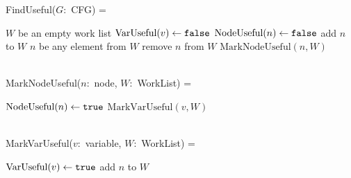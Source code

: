 
FindUseful($G$:~CFG) =
\begin{myalgorithmic}
\LET $W$ be an empty work list
 \STATE $\text{VarUseful}(v) \gets \texttt{false}$
\ENDFOR
{}
 \STATE $\text{NodeUseful}(n) \gets \texttt{false}$
  \STATE add $n$ to $W$
 \ENDIF
\ENDFOR
      \EMPTYLINE
{}
 \LET $n$ be any element from $W$
 \STATE remove $n$ from $W$
 \STATE $\text{MarkNodeUseful}(n, W)$
\ENDWHILE
\end{myalgorithmic}
~\\
MarkNodeUseful($n$:~node, $W$:~WorkList) =
\begin{myalgorithmic}
\STATE $\text{NodeUseful}(n) \gets \texttt{true}$
\STATE{}
  \STATE $\text{MarkVarUseful}(v, W)$
 \ENDIF
\ENDFOR
\end{myalgorithmic}
~\\
MarkVarUseful($v$:~variable, $W$:~WorkList) =
\begin{myalgorithmic}
\STATE $\text{VarUseful}(v) \gets \texttt{true}$
\STATE{}
 \STATE{}
  \STATE add $n$ to $W$
 \ENDIF
\ENDFOR
\end{myalgorithmic}
